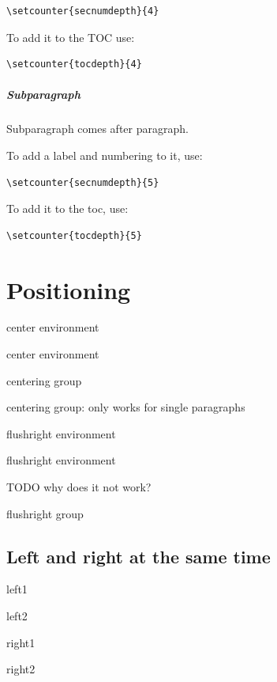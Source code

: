 \documentclass[12pt]{article}
\begin{document}
\begin{lstlisting}
\setcounter{secnumdepth}{4}
\end{lstlisting}

To add it to the TOC use:

\begin{lstlisting}
\setcounter{tocdepth}{4}
\end{lstlisting}

\subparagraph{Subparagraph}\label{subparagraph}

Subparagraph comes after paragraph.

To add a label and numbering to it, use:

\begin{lstlisting}
\setcounter{secnumdepth}{5}
\end{lstlisting}

To add it to the toc, use:

\begin{lstlisting}
\setcounter{tocdepth}{5}
\end{lstlisting}

\section{Positioning}\label{positioning}

\begin{center}
center environment

center environment
\end{center}

{\centering
centering group

centering group: only works for single paragraphs
}

\begin{flushright}
flushright environment

flushright environment
\end{flushright}

TODO why does it not work?

{\flushright flushright group}

\subsection{Left and right at the same time}

\begin{minipage}[t]{0.5\textwidth}
\flushleft
left1

left2
\end{minipage}
\hfill
\begin{minipage}[t]{0.5\textwidth}
\flushright
right1

right2
\end{minipage}
\end{document}
